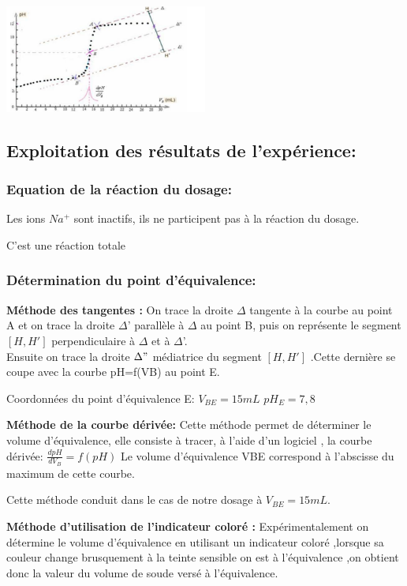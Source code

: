 \documentclass[12pt]{article}
\begin{document}
\begin{center}
	\includegraphics[width=0.5\textwidth]{./img/dosage01.png}
\end{center}

\subsection{Exploitation des résultats de l'expérience:}
\subsubsection{Equation de la réaction du dosage: }
Les ions $Na^+$ sont inactifs, ils ne participent pas à la réaction du dosage.


C'est une réaction totale


\subsubsection{Détermination du point d'équivalence:}

\textbf{Méthode des tangentes : }On trace la droite $\Delta$ tangente à la courbe au point A et on trace la droite $\Delta$' parallèle à $\Delta$ au point
B, puis on représente le segment $[H,H']$ perpendiculaire à $\Delta$ et à $\Delta$'.
\\Ensuite on trace la droite $\Delta"$ médiatrice du segment $[H,H']$
.Cette dernière se coupe avec la courbe pH=f(VB) au point E.

Coordonnées du point d'équivalence E: $V_{BE}=15mL$ $pH_E = 7,8$


\textbf{Méthode de la courbe dérivée: } Cette méthode permet de déterminer le volume d'équivalence, elle consiste à tracer, à l'aide
d'un logiciel , la courbe dérivée: $\frac{dpH}{dV_B} = f(pH)$ Le volume d'équivalence VBE correspond à l'abscisse du maximum de cette courbe.

Cette méthode conduit dans le cas de notre dosage à $V_{BE}=15mL$.

\textbf{Méthode d’utilisation de l'indicateur coloré : }
Expérimentalement on détermine le volume d'équivalence en utilisant un
indicateur coloré ,lorsque sa couleur change brusquement à la teinte sensible on est à l'équivalence ,on obtient donc la valeur du
volume de soude versé à l'équivalence.
\end{document}
